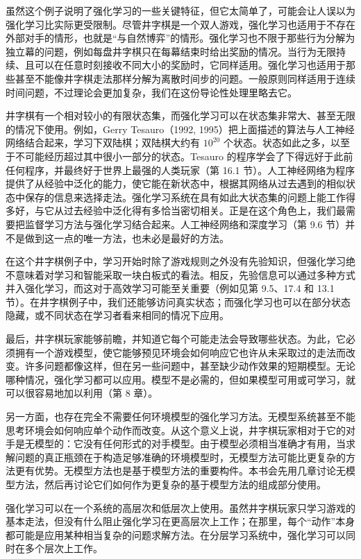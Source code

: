 \documentclass[UTF8, 12pt, fontset=fandol, oneside]{ctexart}
\begin{document}
虽然这个例子说明了强化学习的一些关键特征，但它太简单了，可能会让人误以为强化学习比实际更受限制。尽管井字棋是一个双人游戏，强化学习也适用于不存在外部对手的情形，也就是“与自然博弈”的情形。强化学习也不限于那些行为分解为独立幕的问题，例如每盘井字棋只在每幕结束时给出奖励的情况。当行为无限持续、且可以在任意时刻接收不同大小的奖励时，它同样适用。强化学习也适用于那些甚至不能像井字棋走法那样分解为离散时间步的问题。一般原则同样适用于连续时间问题，不过理论会更加复杂，我们在这份导论性处理里略去它。

井字棋有一个相对较小的有限状态集，而强化学习可以在状态集非常大、甚至无限的情况下使用。例如，Gerry Tesauro（1992, 1995）把上面描述的算法与人工神经网络结合起来，学习下双陆棋；双陆棋大约有 $10^{20}$ 个状态。状态如此之多，以至于不可能经历超过其中很小一部分的状态。Tesauro 的程序学会了下得远好于此前任何程序，并最终好于世界上最强的人类玩家（第 16.1 节）。人工神经网络为程序提供了从经验中泛化的能力，使它能在新状态中，根据其网络从过去遇到的相似状态中保存的信息来选择走法。强化学习系统在具有如此大状态集的问题上能工作得多好，与它从过去经验中泛化得有多恰当密切相关。正是在这个角色上，我们最需要把监督学习方法与强化学习结合起来。人工神经网络和深度学习（第 9.6 节）并不是做到这一点的唯一方法，也未必是最好的方法。

在这个井字棋例子中，学习开始时除了游戏规则之外没有先验知识，但强化学习绝不意味着对学习和智能采取一块白板式的看法。相反，先验信息可以通过多种方式并入强化学习，而这对于高效学习可能至关重要（例如见第 9.5、17.4 和 13.1 节）。在井字棋例子中，我们还能够访问真实状态；而强化学习也可以在部分状态隐藏，或不同状态在学习者看来相同的情况下应用。

最后，井字棋玩家能够前瞻，并知道它每个可能走法会导致哪些状态。为此，它必须拥有一个游戏模型，使它能够预见环境会如何响应它也许从未采取过的走法而改变。许多问题都像这样，但在另一些问题中，甚至缺少动作效果的短期模型。无论哪种情况，强化学习都可以应用。模型不是必需的，但如果模型可用或可学习，就可以很容易地加以利用（第 8 章）。

另一方面，也存在完全不需要任何环境模型的强化学习方法。无模型系统甚至不能思考环境会如何响应单个动作而改变。从这个意义上说，井字棋玩家相对于它的对手是无模型的：它没有任何形式的对手模型。由于模型必须相当准确才有用，当求解问题的真正瓶颈在于构造足够准确的环境模型时，无模型方法可能比更复杂的方法更有优势。无模型方法也是基于模型方法的重要构件。本书会先用几章讨论无模型方法，然后再讨论它们如何作为更复杂的基于模型方法的组成部分使用。

强化学习可以在一个系统的高层次和低层次上使用。虽然井字棋玩家只学习游戏的基本走法，但没有什么阻止强化学习在更高层次上工作；在那里，每个“动作”本身都可能是应用某种相当复杂的问题求解方法。在分层学习系统中，强化学习可以同时在多个层次上工作。
\end{document}
